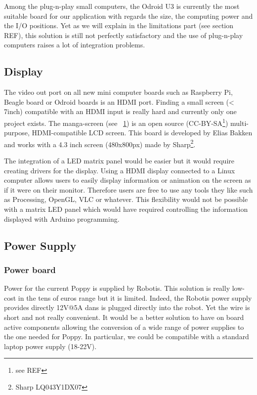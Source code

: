 Among the plug-n-play small computers, the Odroid U3 is currently the most suitable board for our application with regards the size, the computing power and the I/O positions.
Yet as we will explain in the limitations part (see section REF), this solution is still not perfectly satisfactory and the use of plug-n-play computers raises a lot of integration problems.

\subsection{Display} %

The video out port on all new mini computer boards such as Raspberry Pi, Beagle board or Odroid boards is an HDMI port. Finding a small screen (< 7inch) compatible with an HDMI input is really hard and currently only one project exists. The manga-screen (see \figurename~\ref{fig:manga-screen}) is an open source (CC-BY-SA\footnote{see REF}) multi-purpose, HDMI-compatible LCD screen. This board is developed by Elias Bakken and works with a 4.3 inch screen (480x800px) made by Sharp\footnote{Sharp LQ043Y1DX07}.

\begin{figure}[ht]
\centering
    \hfil
    \caption{}
    \label{fig:manga-screen}
\end{figure}

The integration of a LED matrix panel would be easier but it would require creating drivers for the display.
Using a HDMI display connected to a Linux computer allows users to easily display information or animation on the screen as if it were on their monitor. Therefore users are free to use any tools they like such as Processing, OpenGL, VLC or whatever. This flexibility would not be possible with a matrix LED panel which would have required controlling the information displayed with Arduino programming.

\subsection{Power Supply} %
\label{ssub:alimentation}

\subsubsection{Power board} %
Power for the current Poppy is supplied by Robotis. This solution is really low-cost in the tens of euros range but it is limited. Indeed, the Robotis power supply provides directly 12V@5A dans is plugged directly into the robot. Yet the wire is short and not really convenient. It would be a better solution to have on board active components allowing the conversion of a wide range of power supplies to the one needed for Poppy. In particular, we could be compatible with a standard laptop power supply (18-22V).

